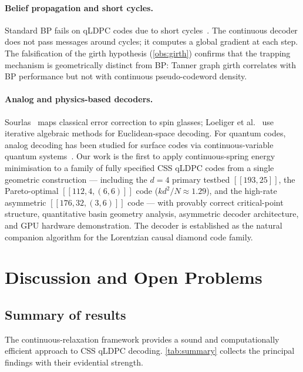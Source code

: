 \documentclass[12pt,a4paper]{article}
\theoremstyle{plain}
\theoremstyle{definition}
\theoremstyle{remark}
\begin{document}
\paragraph{Belief propagation and short cycles.}
Standard BP fails on qLDPC codes due to short cycles~\cite{Roffe2020}.
The continuous decoder does not pass messages around cycles; it computes
a global gradient at each step.
The falsification of the girth hypothesis (\cref{obs:girth}) confirms
that the trapping mechanism is geometrically distinct from BP: Tanner
graph girth correlates with BP performance but not with continuous
pseudo-codeword density.

\paragraph{Analog and physics-based decoders.}
Sourlas~\cite{Sourlas1989} maps classical error correction to spin
glasses; Loeliger et al.~\cite{Loeliger1995} use iterative algebraic
methods for Euclidean-space decoding.
For quantum codes, analog decoding has been studied for surface codes
via continuous-variable quantum systems~\cite{Albert2019}.
Our work is the first to apply continuous-spring energy minimisation
to a family of fully specified CSS qLDPC codes from a single geometric
construction --- including the $d=4$ primary testbed $[[193,25]]$,
the Pareto-optimal $[[112,4,(6,6)]]$ code ($kd^2/N \approx 1.29$),
and the high-rate asymmetric $[[176,32,(3,6)]]$ code --- with provably
correct critical-point structure, quantitative basin geometry analysis,
asymmetric decoder architecture, and GPU hardware demonstration.
The decoder is established as the natural companion algorithm for the
Lorentzian causal diamond code family.

\section{Discussion and Open Problems}\label{sec:discussion}

\subsection{Summary of results}

The continuous-relaxation framework provides a sound and computationally
efficient approach to CSS qLDPC decoding.
\cref{tab:summary} collects the principal findings with their evidential
strength.
\end{document}
